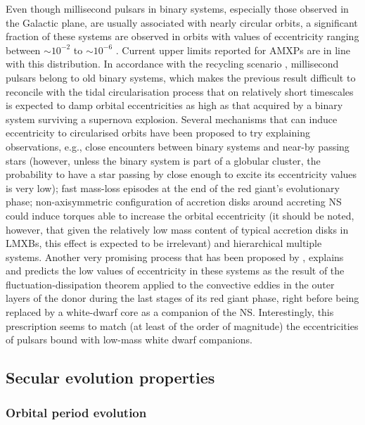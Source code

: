 \documentclass[fleqn,usenatbib]{mnras}
\begin{document}
Even though millisecond pulsars in binary systems, especially those observed in the Galactic plane, are usually associated with nearly circular orbits, a significant fraction of these systems are observed in orbits with values of eccentricity ranging between $\sim 10^{-2}$ to $\sim 10^{-6}$ \citep[roughly 60\% of the binary millisecond pulsars reported in the \textit{ATNF} catalogue meet this condition;][]{Manchester:2005tg}. Current upper limits reported for AMXPs are in line with this distribution. In accordance with the recycling scenario \citep[see e.g.,][]{Bhattacharya91}, millisecond pulsars belong to old binary systems, which makes the previous result difficult to reconcile with the tidal circularisation process that on relatively short timescales is expected to damp orbital eccentricities as high as that acquired by a binary system surviving a supernova explosion. Several mechanisms that can induce eccentricity to circularised orbits have been proposed to try explaining observations, e.g., close encounters between binary systems and near-by passing stars (however, unless the binary system is part of a globular cluster, the probability to have a star passing by close enough to excite its eccentricity values is very low); fast mass-loss episodes at the end of the red giant's evolutionary phase; non-axisymmetric configuration of accretion disks around accreting NS could induce torques able to increase the orbital eccentricity (it should be noted, however, that given the relatively low mass content of typical accretion disks in LMXBs, this effect is expected to be irrelevant) and hierarchical multiple systems. Another very promising process that has been proposed by \citet{Phinney:1992ty}, explains and predicts the low values of eccentricity in these systems as the result of the fluctuation-dissipation theorem applied to the convective eddies in the outer layers of the donor during the last stages of its red giant phase, right before being replaced by a white-dwarf core as a companion of the NS. Interestingly, this prescription seems to match (at least of the order of magnitude) the eccentricities of pulsars bound with low-mass white dwarf companions. 

\subsection{Secular evolution properties}

\subsubsection{Orbital period evolution} 
\label{sec:orb}
\end{document}
